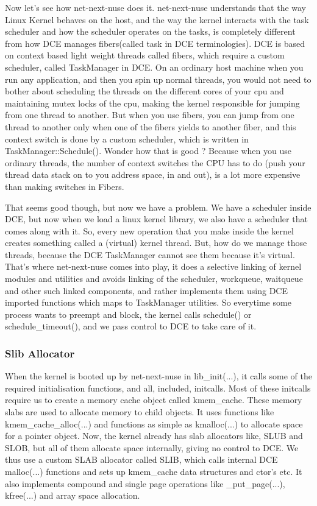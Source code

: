 \documentclass{sig-alternate}
\begin{document}
Now let’s see how net-next-nuse does it. net-next-nuse understands that the way Linux Kernel behaves on the host, and the way the kernel interacts with the task 
scheduler and how the scheduler operates on the tasks, is completely different from how DCE manages fibers(called task in DCE terminologies). 
DCE is based on context based light weight threads called fibers, which require a custom scheduler, called TaskManager in DCE. On an ordinary
host machine when you run any application, and then you spin up normal threads, you would not need to bother about scheduling the threads on 
the different cores of your cpu and maintaining mutex locks of the cpu, making the kernel responsible for jumping from one thread to another. 
But when you use fibers, you can jump from one thread to another only when one of the fibers yields to another fiber, and this context switch 
is done by a custom scheduler, which is written in TaskManager::Schedule(). Wonder how that is good ? Because when you use ordinary threads, 
the number of context switches the CPU has to do (push your thread data stack on to you address space, in and out), is a lot more expensive 
than making switches in Fibers.

That seems good though, but now we have a problem. We have a scheduler inside DCE, but now when we load a linux kernel library, we also 
have a scheduler that comes along with it. So, every new operation that you make inside the kernel creates something called a (virtual) 
kernel thread. But, how do we manage those threads, because the DCE TaskManager cannot see them because it’s virtual. That’s where net-next-nuse 
comes into play, it does a selective linking of kernel modules and utilities and avoids linking of the scheduler, workqueue, waitqueue 
and other such linked components, and rather implements them using DCE imported functions which maps to TaskManager utilities. So everytime 
some process wants to preempt and block, the kernel calls schedule() or schedule\_timeout(), and we pass control to DCE to take care of it. 

\subsubsection{Slib Allocator}
When the kernel is booted up by net-next-nuse in lib\_init(...), it calls some of the required initialisation functions, and all, included, initcalls. 
Most of these initcalls require us to create a memory cache object called kmem\_cache. These memory slabs are used to allocate memory to child 
objects. It uses functions like kmem\_cache\_alloc(...) and functions as simple as kmalloc(...) to allocate space for a pointer object. Now, the 
kernel already has slab allocators like, SLUB and SLOB, but all of them allocate space internally, giving no control to DCE. We thus use a custom 
SLAB allocator called SLIB, which calls internal DCE malloc(...) functions and sets up kmem\_cache data structures and ctor’s etc. It also 
implements compound and single page operations like \_put\_page(...), kfree(...)  and array space allocation. 
\end{document}
